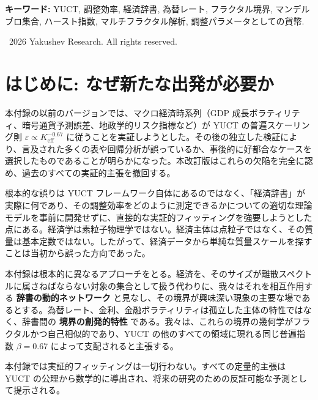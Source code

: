 \documentclass[12pt,a4paper]{article}
\theoremstyle{remark}
\begin{document}
\begin{titlepage}
		\vspace{1cm}
		
		\noindent
		\small\textbf{キーワード:} YUCT, 調整効率, 経済辞書, 為替レート, フラクタル境界, マンデルブロ集合, ハースト指数, マルチフラクタル解析, 調整パラメータとしての貨幣.
		
		\vspace{0.5cm}
		
		\noindent
		\textcopyright\ 2026 Yakushev Research. All rights reserved.
	\end{titlepage}
	
	\tableofcontents
	\newpage
	
	\section{はじめに: なぜ新たな出発が必要か}
	
	本付録の以前のバージョンでは、マクロ経済時系列（GDP 成長ボラティリティ、暗号通貨予測誤差、地政学的リスク指標など）が YUCT の普遍スケーリング則 \(\varepsilon \propto K_{\mathrm{eff}}^{-0.67}\) に従うことを実証しようとした。その後の独立した検証により、言及された多くの表や回帰分析が誤っているか、事後的に好都合なケースを選択したものであることが明らかになった。本改訂版はこれらの欠陥を完全に認め、過去のすべての実証的主張を撤回する。
	
	根本的な誤りは YUCT フレームワーク自体にあるのではなく、「経済辞書」が実際に何であり、その調整効率をどのように測定できるかについての適切な理論モデルを事前に開発せずに、直接的な実証的フィッティングを強要しようとした点にある。経済学は素粒子物理学ではない。経済主体は点粒子ではなく、その質量は基本定数ではない。したがって、経済データから単純な質量スケールを探すことは当初から誤った方向であった。
	
	本付録は根本的に異なるアプローチをとる。経済を、そのサイズが離散スペクトルに属さねばならない対象の集合として扱う代わりに、我々はそれを相互作用する \textbf{辞書の動的ネットワーク} と見なし、その境界が興味深い現象の主要な場であるとする。為替レート、金利、金融ボラティリティは孤立した主体の特性ではなく、辞書間の \textbf{境界の創発的特性} である。我々は、これらの境界の幾何学がフラクタルかつ自己相似的であり、YUCT の他のすべての領域に現れる同じ普遍指数 \(\beta = 0.67\) によって支配されると主張する。
	
	本付録では実証的フィッティングは一切行わない。すべての定量的主張は YUCT の公理から数学的に導出され、将来の研究のための反証可能な予測として提示される。
	
\end{document}

